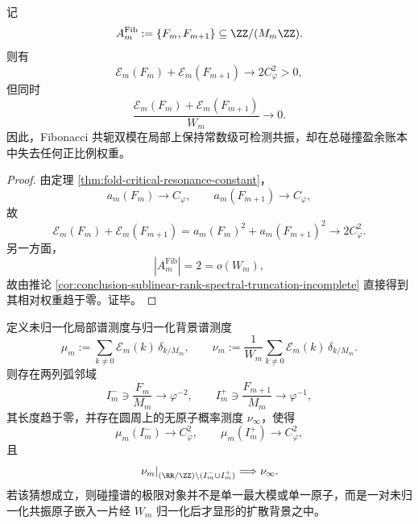 \begin{corollary}\label{cor:conclusion-fibonacci-twin-resonance-macro-weightlessness}
记
\[
A_m^{\mathrm{Fib}}:=\{F_m,F_{m+1}\}\subseteq \ZZ/(M_m\ZZ).
\]
则有
\[
\mathcal E_m(F_m)+\mathcal E_m(F_{m+1})\longrightarrow 2C_\varphi^2>0,
\]
但同时
\[
\frac{\mathcal E_m(F_m)+\mathcal E_m(F_{m+1})}{W_m}\longrightarrow 0.
\]
因此，Fibonacci 共轭双模在局部上保持常数级可检测共振，却在总碰撞盈余账本中失去任何正比例权重。
\end{corollary}

\begin{proof}
由定理 \ref{thm:fold-critical-resonance-constant}，
\[
a_m(F_m)\to C_\varphi,
\qquad
a_m(F_{m+1})\to C_\varphi,
\]
故
\[
\mathcal E_m(F_m)+\mathcal E_m(F_{m+1})
=
a_m(F_m)^2+a_m(F_{m+1})^2
\longrightarrow 2C_\varphi^2.
\]
另一方面，
\[
|A_m^{\mathrm{Fib}}|=2=o(W_m),
\]
故由推论 \ref{cor:conclusion-sublinear-rank-spectral-truncation-incomplete} 直接得到其相对权重趋于零。证毕。
\end{proof}

\begin{conjecture}[双尺度谱极限中的原子共振与扩散背景]\label{conj:conclusion-two-scale-spectrum-atomic-resonance-diffuse-background}
定义未归一化局部谱测度与归一化背景谱测度
\[
\mu_m:=\sum_{k\ne 0}\mathcal E_m(k)\,\delta_{k/M_m},
\qquad
\nu_m:=\frac1{W_m}\sum_{k\ne 0}\mathcal E_m(k)\,\delta_{k/M_m}.
\]
则存在两列弧邻域
\[
I_m^-\ni \frac{F_m}{M_m}\to \varphi^{-2},
\qquad
I_m^+\ni \frac{F_{m+1}}{M_m}\to \varphi^{-1},
\]
其长度趋于零，并存在圆周上的无原子概率测度 \(\nu_\infty\)，使得
\[
\mu_m(I_m^-)\to C_\varphi^2,
\qquad
\mu_m(I_m^+)\to C_\varphi^2,
\]
且
\[
\left.\nu_m\right|_{(\RR/\ZZ)\setminus (I_m^-\cup I_m^+)}
\Longrightarrow
\nu_\infty.
\]
若该猜想成立，则碰撞谱的极限对象并不是单一最大模或单一原子，而是一对未归一化共振原子嵌入一片经 \(W_m\) 归一化后才显形的扩散背景之中。
\end{conjecture}
